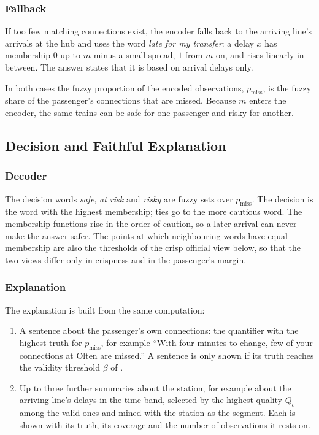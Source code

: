 \subsubsection*{Fallback} If too few matching connections exist, the encoder falls back to the
arriving line's arrivals at the hub and uses the word \emph{late for my transfer}: a delay
$x$ has membership $0$ up to $m$ minus a small spread, $1$ from $m$ on, and rises linearly in
between. The answer states that it is based on arrival delays only.

In both cases the fuzzy proportion of the encoded observations, $p_{\text{miss}}$, is the
fuzzy share of the passenger's connections that are missed. Because $m$ enters the encoder,
the same trains can be safe for one passenger and risky for another.

\subsection{Decision and Faithful Explanation}
\label{sec:explanation}
\subsubsection*{Decoder} The decision words \emph{safe}, \emph{at risk} and \emph{risky} are
fuzzy sets over $p_{\text{miss}}$. The decision is the word with the highest membership;
ties go to the more cautious word. The membership functions rise in the order of caution,
so a later arrival can never make the answer safer. The points at which neighbouring words
have equal membership are also the thresholds of the crisp official view below, so that the
two views differ only in crispness and in the passenger's margin.

\subsubsection*{Explanation} The explanation is built from the same computation:
\begin{enumerate}
  \item A sentence about the passenger's own connections: the quantifier with the highest
  truth for $p_{\text{miss}}$, for example ``With four minutes to change, few of your
  connections at Olten are missed.'' A sentence is only shown if its truth reaches the
  validity threshold $\beta$ of \citet{pincay2021}.
  \item Up to three further summaries about the station, for example about the arriving
  line's delays in the time band, selected by the highest quality $Q_c$ among the valid
  ones and mined with the station as the segment. Each is shown with its truth, its
  coverage and the number of observations it rests on.
\end{enumerate}

